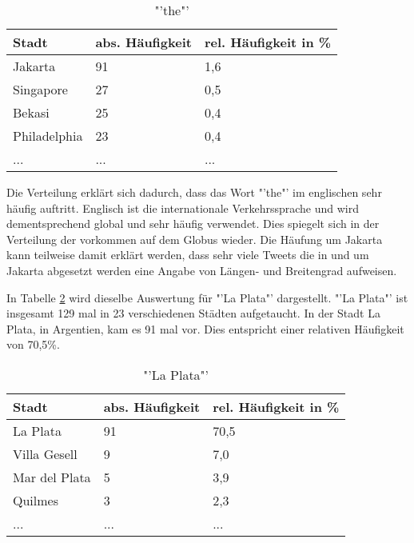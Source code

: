 				\begin{table}[h]
				\centering
				\caption{"'the"'}
				\label{tab:the}
				\begin{tabular}{|l|l|l|}
				\hline
				Stadt             & abs. Häufigkeit & rel. Häufigkeit in \% \\ \hline \hline
				Jakarta           & 91              & 1,6                       \\ \hline
				Singapore         & 27              & 0,5                       \\ \hline
				Bekasi            & 25              & 0,4                       \\ \hline
				Philadelphia      & 23              & 0,4                       \\ \hline
				... & ... & ... \\ \hline
				\end{tabular}
				\end{table}

				Die Verteilung erklärt sich dadurch, dass das Wort "'the"' im englischen sehr häufig auftritt.
				Englisch ist die internationale Verkehrssprache und wird dementsprechend global und sehr häufig verwendet.
				Dies spiegelt sich in der Verteilung der vorkommen auf dem Globus wieder.
				Die Häufung um Jakarta kann teilweise damit erklärt werden, dass sehr viele Tweets die in und um Jakarta abgesetzt werden eine Angabe von Längen- und Breitengrad aufweisen. 

				In Tabelle \ref{tab:laPlata} wird dieselbe Auswertung für "'La Plata"' dargestellt. 
				"'La Plata"' ist insgesamt 129 mal in 23 verschiedenen Städten aufgetaucht. 
				In der Stadt La Plata, in Argentien, kam es 91 mal vor.
				Dies entspricht einer relativen Häufigkeit von 70,5\%.

				\begin{table}[h]
				\centering
				\caption{"'La Plata"'}
				\label{tab:laPlata}
				\begin{tabular}{|l|l|l|}
				\hline
				Stadt            & abs. Häufigkeit & rel. Häufigkeit in \% \\ \hline \hline
				La Plata         & 91              & 70,5                      \\ \hline
				Villa Gesell     & 9               & 7,0                       \\ \hline
				Mar del Plata    & 5               & 3,9                       \\ \hline
				Quilmes          & 3               & 2,3                       \\ \hline
				... & ... & ... \\ \hline
				\end{tabular}
				\end{table}

